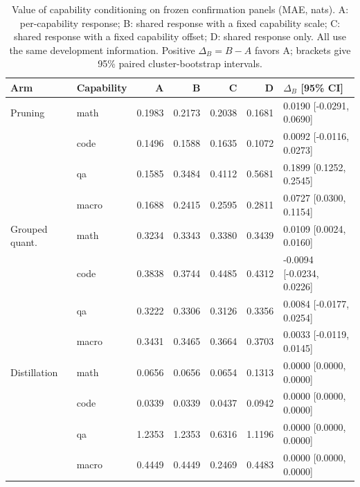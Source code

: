 \begin{table}[H]
\centering
\small
\setlength{\tabcolsep}{3pt}
\caption{Value of capability conditioning on frozen confirmation panels (MAE, nats). A: per-capability response; B: shared response with a fixed capability scale; C: shared response with a fixed capability offset; D: shared response only. All use the same development information. Positive $\Delta_B=B-A$ favors A; brackets give 95\% paired cluster-bootstrap intervals.}
\label{tab:cap_conditioning}
\begin{tabular}{llrrrrl}
\toprule
Arm & Capability & A & B & C & D & $\Delta_B$ [95\% CI] \\
\midrule
Pruning & math & 0.1983 & 0.2173 & 0.2038 & 0.1681 & 0.0190 [-0.0291, 0.0690] \\
 & code & 0.1496 & 0.1588 & 0.1635 & 0.1072 & 0.0092 [-0.0116, 0.0273] \\
 & qa & 0.1585 & 0.3484 & 0.4112 & 0.5681 & 0.1899 [0.1252, 0.2545] \\
 & macro & 0.1688 & 0.2415 & 0.2595 & 0.2811 & 0.0727 [0.0300, 0.1154] \\
\midrule
Grouped quant. & math & 0.3234 & 0.3343 & 0.3380 & 0.3439 & 0.0109 [0.0024, 0.0160] \\
 & code & 0.3838 & 0.3744 & 0.4485 & 0.4312 & -0.0094 [-0.0234, 0.0226] \\
 & qa & 0.3222 & 0.3306 & 0.3126 & 0.3356 & 0.0084 [-0.0177, 0.0254] \\
 & macro & 0.3431 & 0.3465 & 0.3664 & 0.3703 & 0.0033 [-0.0119, 0.0145] \\
\midrule
Distillation & math & 0.0656 & 0.0656 & 0.0654 & 0.1313 & 0.0000 [0.0000, 0.0000] \\
 & code & 0.0339 & 0.0339 & 0.0437 & 0.0942 & 0.0000 [0.0000, 0.0000] \\
 & qa & 1.2353 & 1.2353 & 0.6316 & 1.1196 & 0.0000 [0.0000, 0.0000] \\
 & macro & 0.4449 & 0.4449 & 0.2469 & 0.4483 & 0.0000 [0.0000, 0.0000] \\
\bottomrule
\end{tabular}
\par\smallskip

\end{table}
